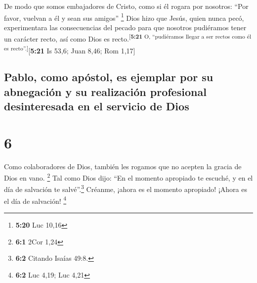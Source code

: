  De modo que somos embajadores de Cristo, como si él
rogara por nosotros: ``Por favor, vuelvan a él y sean sus amigos''
\footnote{\textbf{5:20} Luc 10,16}  Dios hizo que Jesús,
quien nunca pecó, experimentara las consecuencias del pecado para que
nosotros pudiéramos tener un carácter recto, así como Dios es
recto.\textsuperscript{{[}\textbf{5:21} O, ``pudiéramos llegar a ser
rectos como él es recto''.{]}}{[}\textbf{5:21} Is 53,6; Juan 8,46; Rom
1,17{]}

\hypertarget{pablo-como-apuxf3stol-es-ejemplar-por-su-abnegaciuxf3n-y-su-realizaciuxf3n-profesional-desinteresada-en-el-servicio-de-dios}{%
\subsection{Pablo, como apóstol, es ejemplar por su abnegación y su
realización profesional desinteresada en el servicio de
Dios}\label{pablo-como-apuxf3stol-es-ejemplar-por-su-abnegaciuxf3n-y-su-realizaciuxf3n-profesional-desinteresada-en-el-servicio-de-dios}}

\hypertarget{section-5}{%
\section{6}\label{section-5}}

 Como colaboradores de Dios, también les rogamos que no
acepten la gracia de Dios en vano. \footnote{\textbf{6:1} 2Cor 1,24}
 Tal como Dios dijo: ``En el momento apropiado te escuché,
y en el día de salvación te salvé''.\footnote{\textbf{6:2} Citando
  Isaías 49:8.} Créanme, ¡ahora es el momento apropiado! ¡Ahora es el
día de salvación! \footnote{\textbf{6:2} Luc 4,19; Luc 4,21}

